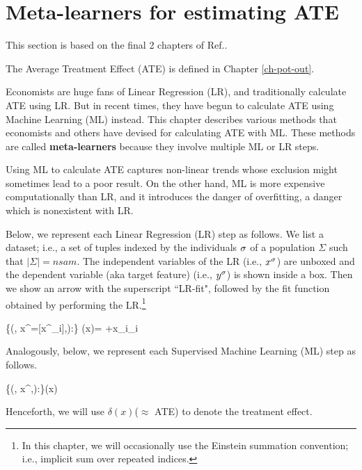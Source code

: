 \chapter{Meta-learners
for estimating ATE}
\label{ch-meta-learners}


This section
is based on the final 2 chapters of
Ref.\cite{alves-book}.

The Average Treatment Effect (ATE)
is defined in Chapter \ref{ch-pot-out}.

Economists are huge fans of Linear Regression (LR),
and traditionally calculate  ATE using LR.
But in recent times,
they have begun to
calculate ATE using Machine Learning
(ML) instead. 
This chapter describes various methods
that economists and others have devised
for calculating ATE with ML.
These methods
are called {\bf meta-learners}
because they involve multiple
ML or LR steps.

Using ML
to calculate
ATE
captures non-linear trends
whose exclusion might sometimes lead to a poor result. 
On the other hand,
ML is more expensive computationally
than LR, 
and it introduces
the danger of overfitting, a danger
which is nonexistent with LR.




Below,
we represent each
Linear Regression (LR) step
as follows. 
We list a dataset; i.e., a 
set of tuples indexed by
the individuals $\sigma$
of a population $\Sigma$
such that $|\Sigma|=nsam$.
The independent variables 
of the LR (i.e., $x^\sigma$)
are unboxed and the
 dependent variable 
(aka target feature) 
(i.e., $y^\sigma$)
is shown inside a box.
Then we show an arrow with the
superscript ``LR-fit",
followed by the fit function
obtained by performing the LR.\footnote{
In this chapter,
we will occasionally
use the Einstein summation convention;
i.e.,
implicit sum over
repeated indices.}



\beq
\{(\s, x^\s =[x^\s_i],):\s\in \Sigma\}
\lrarr
 \haty(x)=
\alp +x_i\beta_i
\eeq


Analogously, below,
we represent each
Supervised Machine
 Learning (ML) step as follows.


\beq
\{(\s, x^\s,):\s\in \Sigma\}\mlarr \haty(x)
\label{eq-gen-ml}
\eeq


Henceforth, we will use $\delta(x)$($\approx$ ATE) to
denote the treatment effect.



